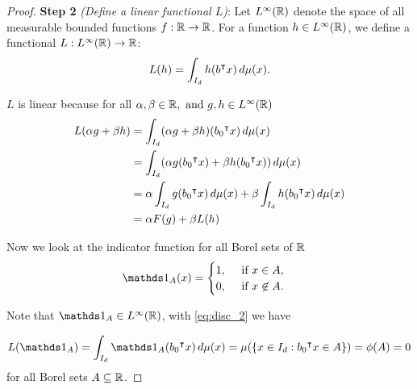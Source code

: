 \begin{proof}
    \textbf{Step 2} \textit{(Define a linear functional $L$)}: Let
    $L^{\infty}(\mathbb{R})$ denote the space of all measurable bounded functions $f:
    \mathbb{R} \to \mathbb{R}$. For a function $h \in L^{\infty}(\mathbb{R})$, we define a functional
    $L: L^{\infty}(\mathbb{R}) \to \mathbb{R}$:
    \begin{equation}
        L(h) = \int_{I_d} h(b{}^{\intercal} x)\,d\mu(x).
    \end{equation}

    $L$ is linear because for all $\alpha, \beta \in \mathbb{R}, \text{ and } g, h \in
    L^{\infty}(\mathbb{R})$
    \begin{align*}
        L(\alpha g + \beta h)
        &= \int_{I_d} (\alpha g + \beta h) (b_0{}^{\intercal} x) \,d\mu(x) \\
        &= \int_{I_d} (\alpha g(b_0{}^{\intercal} x) + \beta h (b_0{}^{\intercal} x)) \, d\mu(x) \\
        &= \alpha \int_{I_d} g(b_0{}^{\intercal} x) \,d\mu(x) 
            + \beta \int_{I_d} h(b_0{}^{\intercal} x) \,d\mu(x) \\
        &= \alpha F(g) + \beta L(h)
    \end{align*}

    Now we look at the indicator function for all Borel sets of $\mathbb{R}$
    \begin{equation}
        \indicator{A}(x) =
        \begin{cases}
            1, \quad \text{ if } x \in A, \\
            0, \quad \text{ if } x \not\in A.
        \end{cases}
    \end{equation}

     Note that
    $\indicator{A} \in \lp{\infty}(\R)$, with \eqref{eq:disc_2} we have 

    \begin{equation}
        L(\indicator{A}) = \int_{I_d} \indicator{A}(b_0\tr x)\,d\mu(x)
        = \mu(\{ x\in I_d: b_0\tr x\in A \}) = \phi(A) = 0
    \end{equation}
    for all Borel sets $A \subseteq \mathbb{R}$.


\end{proof}
